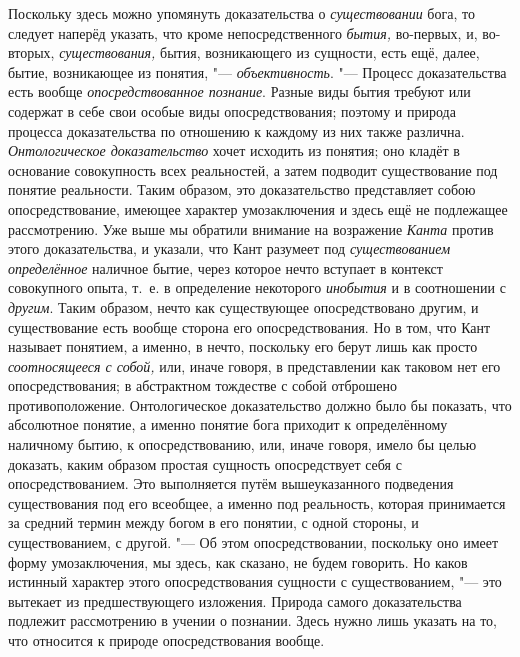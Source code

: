 Поскольку здесь можно упомянуть доказательства о
{\em существовании} бога, то следует наперёд указать,
что кроме непосредственного {\em бытия,} во-первых, и,
во-вторых, {\em существования,} бытия, возникающего из
сущности, есть ещё, далее, бытие, возникающее из понятия, "---
{\em объективность}. "--- Процесс доказательства есть
вообще {\em опосредствованное познание}. Разные виды
бытия требуют или содержат в себе свои особые виды опосредствования;
поэтому и природа процесса доказательства по отношению к каждому из них
также различна. {\em Онтологическое доказательство}
хочет исходить из понятия; оно кладёт в основание совокупность всех
реальностей, а затем подводит существование под понятие реальности. Таким
образом, это доказательство представляет собою опосредствование, имеющее
характер умозаключения и здесь ещё не подлежащее рассмотрению. Уже
выше
мы обратили внимание на возражение {\em Канта} против
этого доказательства, и указали, что Кант разумеет под
{\em существованием определённое} наличное бытие, через
которое нечто вступает в контекст совокупного опыта, т.~е. в определение
некоторого {\em инобытия} и в соотношении с
{\em другим}. Таким образом, нечто как существующее
опосредствовано другим, и существование есть вообще сторона его
опосредствования. Но в том, что Кант называет понятием, а именно, в нечто,
поскольку его берут лишь как просто {\em соотносящееся
с собой,} или, иначе говоря, в представлении как таковом нет его
опосредствования; в абстрактном тождестве с собой отброшено
противоположение. Онтологическое доказательство должно было бы показать,
что абсолютное понятие, а именно понятие бога приходит к определённому
наличному бытию, к опосредствованию, или, иначе говоря, имело бы целью
доказать, каким образом простая сущность опосредствует себя с
опосредствованием. Это выполняется путём вышеуказанного подведения
существования под его всеобщее, а именно под реальность, которая
принимается за средний термин между богом в его понятии, с одной стороны, и
существованием, с другой. "--- Об этом опосредствовании, поскольку оно имеет
форму умозаключения, мы здесь, как сказано, не будем говорить. Но каков
истинный характер этого опосредствования сущности с существованием, "--- это
вытекает из предшествующего изложения. Природа самого доказательства
подлежит рассмотрению в учении о познании. Здесь нужно лишь указать на то,
что относится к природе опосредствования вообще.

